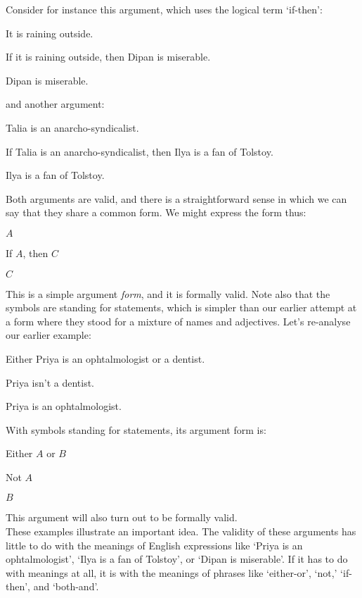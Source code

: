 \documentclass[PHIL101-Textbook.tex]{subfiles}
\begin{document}
\pagebreak
Consider for instance this argument, which uses the logical term `if-then':
	\begin{earg}
		\item[] It is raining outside.
		\item[] If it is raining outside, then Dipan is miserable.
		\item[\therefore] Dipan is miserable.
	\end{earg}
and another argument:
	\begin{earg}
		\item[] Talia is an anarcho-syndicalist.
		\item[] If Talia is an anarcho-syndicalist, then Ilya is a fan of Tolstoy.
		\item[\therefore] Ilya is a fan of Tolstoy.
	\end{earg}
Both arguments are valid, and there is a straightforward sense in which we can say that they share a common form. We might express the form thus:
	\begin{earg}
		\item[] $A$
		\item[] If $A$, then $C$
		\item[\therefore] $C$
	\end{earg}
This is a simple argument \emph{form}, and it is formally valid. Note also that the symbols are standing for statements, which is simpler than our earlier attempt at a form where they stood for a mixture of names and adjectives. Let's re-analyse our earlier example:

\begin{earg}
	\item[] Either Priya is an ophtalmologist or a dentist.
	\item[] Priya isn't a dentist.
	\item[\therefore] Priya is an ophtalmologist.
\end{earg}
With symbols standing for statements, its argument form is:
	\begin{earg}
		\item[] Either $A$ or $B$
		\item[] Not $A$
		\item[\therefore] $B$
	\end{earg}
This argument will also turn out to be formally valid.\\
	
These examples illustrate an important idea. The validity of these arguments has little to do with the meanings of English expressions like `Priya is an ophtalmologist', `Ilya is a fan of Tolstoy', or `Dipan is miserable'. If it has to do with meanings at all, it is with the meanings of phrases like `either-or', `not,' `if-then', and `both-and'. 
\end{document}
